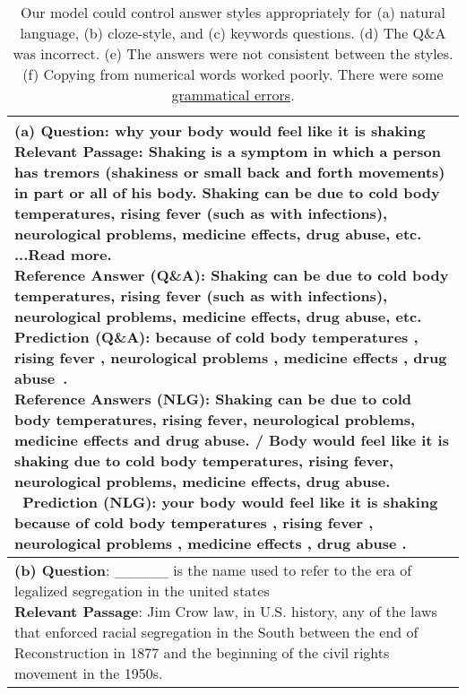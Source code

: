 \documentclass[11pt,a4paper]{article}
\newcommand{\cmark}{\ding{51}}
\theoremstyle{mydef}
\theoremstyle{myprob}
\begin{document}
\begin{table*}[h!]
\centering
\caption{Our model could control answer styles appropriately for (a) natural language, (b) cloze-style, and (c) keywords questions. (d) The Q\&A was incorrect. (e)
The answers were not consistent between the styles. (f) Copying from numerical words worked poorly. There were some \underline{grammatical errors}.  }
\label{tb:examples}
{\footnotesize
\tabcolsep=1pt
\vspace{0.5pt}
\begin{tabular}{p{50em}}
\hline
\vspace{0.5pt}
\pbox{50em}{
\textbf{(a) Question}: why your body would feel like it is shaking\\
\textbf{Relevant Passage}: Shaking is a symptom in which a person has tremors (shakiness or small back and forth movements) in part or all of his body. Shaking can be due to cold body temperatures, rising fever (such as with infections), neurological problems, medicine effects, drug abuse, etc. ...Read more. \\
\textbf{Reference Answer (Q\&A)}: Shaking can be due to cold body temperatures, rising fever (such as with infections), neurological problems, medicine effects, drug abuse, etc.  \\
\textbf{Prediction (Q\&A)}: because of cold body temperatures , rising fever , neurological problems , medicine effects , drug abuse~.~\cmark\\
\textbf{Reference Answers (NLG)}: Shaking can be due to cold body temperatures, rising fever, neurological problems, medicine effects and drug abuse. /
Body would feel like it is shaking due to cold body temperatures, rising fever, neurological problems, medicine effects, drug abuse. \\\
\textbf{Prediction (NLG)}: your body would feel like it is shaking because of cold body temperatures , rising fever , neurological problems , medicine effects , drug abuse . \cmark
}
\vspace{1pt}
\\ \hline
\vspace{0.5pt}
\pbox{50em}{
\textbf{(b) Question}: \_\_\_\_\_ is the name used to refer to the era of legalized segregation in the united states \\
\textbf{Relevant Passage}: Jim Crow law, in U.S. history, any of the laws that enforced racial segregation in the South between the end of Reconstruction in 1877 and the beginning of the civil rights movement in the 1950s.
\\
}
\end{tabular}}
\end{table*}
\end{document}
